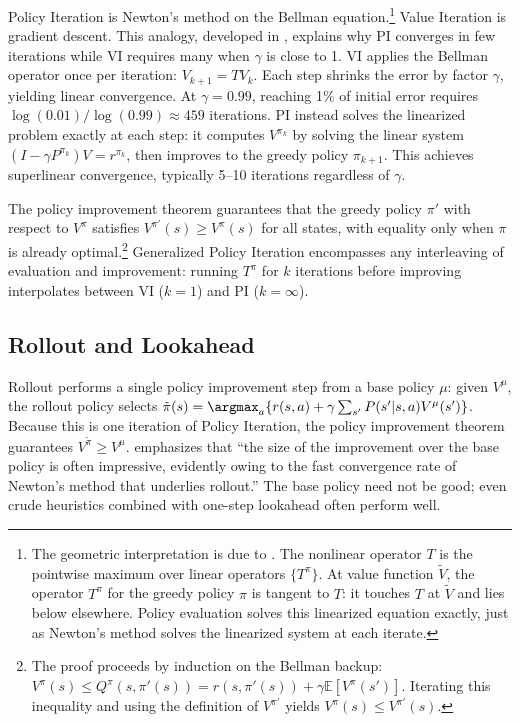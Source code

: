 Policy Iteration is Newton's method on the Bellman equation.\footnote{The geometric interpretation is due to \citet{bertsekas2024}. The nonlinear operator $T$ is the pointwise maximum over linear operators $\{T^\pi\}$. At value function $\tilde{V}$, the operator $T^{\pi}$ for the greedy policy $\pi$ is tangent to $T$: it touches $T$ at $\tilde{V}$ and lies below elsewhere. Policy evaluation solves this linearized equation exactly, just as Newton's method solves the linearized system at each iterate.} Value Iteration is gradient descent. This analogy, developed in \citet{bertsekas2024}, explains why PI converges in few iterations while VI requires many when $\gamma$ is close to 1. VI applies the Bellman operator once per iteration: $V_{k+1} = TV_k$. Each step shrinks the error by factor $\gamma$, yielding linear convergence. At $\gamma = 0.99$, reaching 1\% of initial error requires $\log(0.01)/\log(0.99) \approx 459$ iterations. PI instead solves the linearized problem exactly at each step: it computes $V^{\pi_k}$ by solving the linear system $(I - \gamma P^{\pi_k})V = r^{\pi_k}$, then improves to the greedy policy $\pi_{k+1}$. This achieves superlinear convergence, typically 5--10 iterations regardless of $\gamma$.

The policy improvement theorem guarantees that the greedy policy $\pi'$ with respect to $V^\pi$ satisfies $V^{\pi'}(s) \geq V^\pi(s)$ for all states, with equality only when $\pi$ is already optimal.\footnote{The proof proceeds by induction on the Bellman backup: $V^\pi(s) \leq Q^\pi(s, \pi'(s)) = r(s,\pi'(s)) + \gamma \mathbb{E}[V^\pi(s')]$. Iterating this inequality and using the definition of $V^{\pi'}$ yields $V^\pi(s) \leq V^{\pi'}(s)$.} Generalized Policy Iteration encompasses any interleaving of evaluation and improvement: running $T^\pi$ for $k$ iterations before improving interpolates between VI ($k=1$) and PI ($k=\infty$).


\subsection{Rollout and Lookahead}
\label{sec:rollout}

Rollout performs a single policy improvement step from a base policy $\mu$: given $V^\mu$, the rollout policy selects $\tilde{\pi}(s) = \argmax_a \{ r(s,a) + \gamma \sum_{s'} P(s'|s,a) V^\mu(s') \}$. Because this is one iteration of Policy Iteration, the policy improvement theorem guarantees $V^{\tilde{\pi}} \geq V^\mu$. \citet{bertsekas2024} emphasizes that ``the size of the improvement over the base policy is often impressive, evidently owing to the fast convergence rate of Newton's method that underlies rollout.'' The base policy need not be good; even crude heuristics combined with one-step lookahead often perform well.

